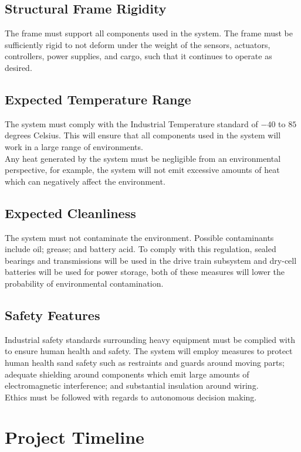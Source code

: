 \documentclass[12pt]{article}
\begin{document}
\subsection{Structural Frame Rigidity}
The frame must support all components used in the system. The frame must be sufficiently rigid to not deform under the weight of the sensors, actuators, controllers, power supplies, and cargo, such that it continues to operate as desired.
\subsection{Expected Temperature Range}
The system must comply with the Industrial Temperature standard of $-40$ to $85$ degrees Celsius. This will ensure that all components used in the system will work in a large range of environments. \\

Any heat generated by the system must be negligible from an environmental perspective, for example, the system will not emit excessive amounts of heat which can negatively affect the environment. 
\subsection{Expected Cleanliness}
The system must not contaminate the environment. Possible contaminants include oil; grease; and battery acid. To comply with this regulation, sealed bearings and transmissions will be used in the drive train subsystem and dry-cell batteries will be used for power storage, both of these measures will lower the probability of environmental contamination.
\subsection{Safety Features}
Industrial safety standards surrounding heavy equipment must be complied with to ensure human health and safety. The system will employ measures to protect human health sand safety such as restraints and guards around moving parts; adequate shielding around components which emit large amounts of electromagnetic interference; and substantial insulation around wiring. \\

Ethics must be followed with regards to autonomous decision making. 

\clearpage
\section{Project Timeline}
\end{document}

